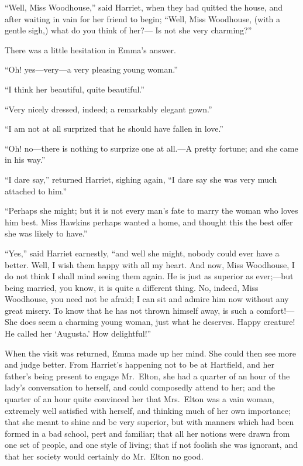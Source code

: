 ``Well, Miss Woodhouse,'' said Harriet, when they had quitted
the house, and after waiting in vain for her friend to begin;
``Well, Miss Woodhouse, (with a gentle sigh,) what do you think of her?---%
Is not she very charming?''

There was a little hesitation in Emma's answer.

``Oh! yes---very---a very pleasing young woman.''

``I think her beautiful, quite beautiful.''

``Very nicely dressed, indeed; a remarkably elegant gown.''

``I am not at all surprized that he should have fallen in love.''

``Oh! no---there is nothing to surprize one at all.---A pretty fortune;
and she came in his way.''

``I dare say,'' returned Harriet, sighing again, ``I dare say she
was very much attached to him.''

``Perhaps she might; but it is not every man's fate to marry the
woman who loves him best.  Miss Hawkins perhaps wanted a home,
and thought this the best offer she was likely to have.''

``Yes,'' said Harriet earnestly, ``and well she might, nobody could ever
have a better.  Well, I wish them happy with all my heart.  And now,
Miss Woodhouse, I do not think I shall mind seeing them again.
He is just as superior as ever;---but being married, you know,
it is quite a different thing.  No, indeed, Miss Woodhouse, you need
not be afraid; I can sit and admire him now without any great misery.
To know that he has not thrown himself away, is such a comfort!---%
She does seem a charming young woman, just what he deserves.
Happy creature!  He called her `Augusta.'  How delightful!''

When the visit was returned, Emma made up her mind.  She could then
see more and judge better.  From Harriet's happening not to be
at Hartfield, and her father's being present to engage Mr.\ Elton,
she had a quarter of an hour of the lady's conversation to herself,
and could composedly attend to her; and the quarter of an hour quite
convinced her that Mrs.\ Elton was a vain woman, extremely well
satisfied with herself, and thinking much of her own importance;
that she meant to shine and be very superior, but with manners which
had been formed in a bad school, pert and familiar; that all her
notions were drawn from one set of people, and one style of living;
that if not foolish she was ignorant, and that her society would
certainly do Mr.\ Elton no good.

